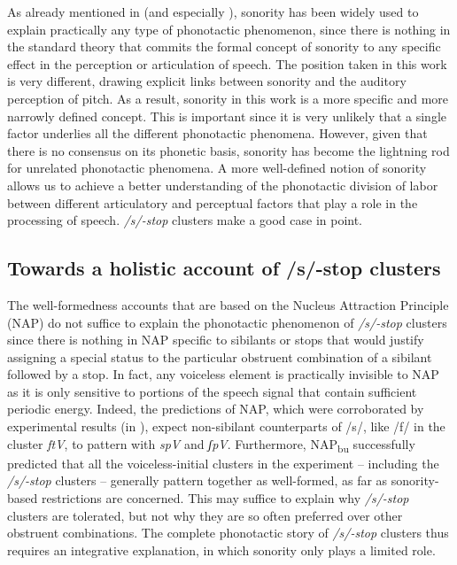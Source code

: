 As already mentioned in  (and especially ), sonority has been widely used to explain practically any type of phonotactic phenomenon, since there is nothing in the standard theory that commits the formal concept of sonority to any specific effect in the perception or articulation of speech. The position taken in this work is very different, drawing explicit links between sonority and the auditory perception of pitch. As a result, sonority in this work is a more specific and more narrowly defined concept. This is important since it is very unlikely that %
a single factor
underlies all the different phonotactic phenomena. 
However, given that there is no consensus on its phonetic basis,
sonority has become the lightning rod for unrelated phonotactic phenomena. A more well-defined notion of sonority allows us to achieve a better understanding of the phonotactic division of labor between different %
articulatory and perceptual factors
that play a role in the processing of speech.
\emph{/s/-stop} clusters make a good case in point.

\subsection{Towards a holistic account of /s/-stop clusters}\label{towards-a-holistic-account-of-s-stop-clusters}

The well-formedness accounts that are based on the Nucleus Attraction Principle (NAP) do
not suffice to explain the phonotactic phenomenon of \emph{/s/-stop} clusters since there is nothing in NAP specific to sibilants or stops that would justify assigning a special status to the particular obstruent combination of a sibilant followed by a stop.
In fact, any voiceless element is practically invisible to NAP as it is only sensitive to portions of the speech signal that contain sufficient periodic energy. Indeed, the predictions of NAP, which were corroborated by experimental results (in ), expect non-sibilant counterparts of /s/, like /f/ in the cluster \emph{ftV}, to pattern with \emph{spV} and \emph{ʃpV}. Furthermore, NAP\textsubscript{bu} successfully predicted that all the voiceless-initial clusters in the experiment -- including the \emph{/s/-stop} clusters -- generally pattern together as well-formed, as far as sonority-based restrictions are concerned.
This may suffice to explain why \emph{/s/-stop} clusters are tolerated, but not why they are so often preferred over other obstruent combinations. The complete phonotactic story of \emph{/s/-stop} clusters thus requires an integrative explanation, in which sonority only plays a limited role.

